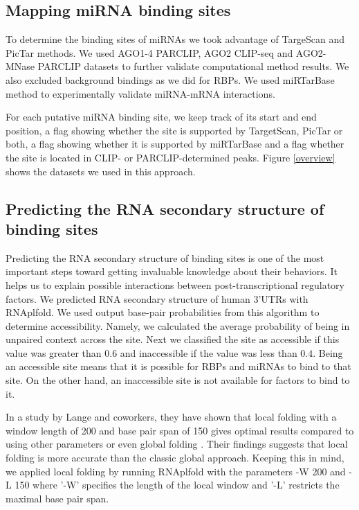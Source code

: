 \subsection{Mapping miRNA binding sites}

To determine the binding sites of miRNAs we took advantage of TargeScan and PicTar methods. We used AGO1-4 PARCLIP, AGO2 CLIP-seq and AGO2-MNase PARCLIP datasets to further validate computational method results. We also excluded background bindings as we did for RBPs. We used miRTarBase method to experimentally validate miRNA-mRNA interactions.

For each putative miRNA binding site, we keep track of its start and end position, a flag showing whether the site is supported by TargetScan, PicTar or both, a flag showing whether it is supported by miRTarBase and a flag whether the site is located in CLIP- or PARCLIP-determined peaks. Figure \ref{overview} shows the datasets we used in this approach.

\subsection{Predicting the RNA secondary structure of binding sites}

Predicting the RNA secondary structure of binding sites is one of the most important steps toward getting invaluable knowledge about their behaviors. It helps us to explain possible interactions between post-transcriptional regulatory factors. We predicted RNA secondary structure of human 3'UTRs with RNAplfold. We used output base-pair probabilities from this algorithm to determine accessibility. Namely, we calculated the average probability of being in unpaired context across the site. Next we classified the site as accessible if this value was greater than $0.6$ and inaccessible if the value was less than $0.4$. Being an accessible site means that it is possible for RBPs and miRNAs to bind to that site. On the other hand, an inaccessible site is not available for factors to bind to it. 

In a study by Lange and coworkers, they have shown that local folding with a window length of 200 and base pair span of 150 gives optimal results compared to using other parameters or even global folding \cite{lange_12}. Their findings suggests that local folding is more accurate than the classic global approach. Keeping this in mind, we applied local folding by running RNAplfold with the parameters -W 200 and -L 150 where '-W' specifies the length of the local window and '-L' restricts the maximal base pair span.

